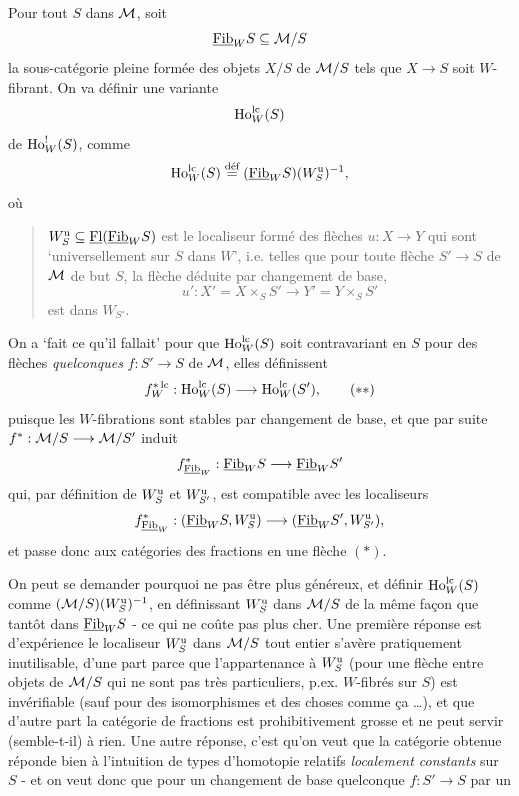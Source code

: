 Pour tout $S$ dans $\mathcal{M}$, soit
\[
\underline{\mathrm{Fib}}_W S \subseteq \mathcal{M}/S
\]
la sous-catégorie pleine formée des objets $X/S$ de $\mathcal{M}/S$ tels que $X \longrightarrow S$ soit $W$-fibrant. On va définir une variante
\[
\mathrm{Ho}^{\mathrm{lc}}_W(S)
\]
de $\mathrm{Ho}^!_W(S)$, comme
\[
\mathrm{Ho}^{\mathrm{lc}}_W(S) \overset{\text{déf}}{=} (\underline{\mathrm{Fib}}_W S)(W^{\mathrm{u}}_S)^{-1},
\]
où

\begin{quote}
$W^{\mathrm{u}}_S \subseteq \underline{\mathrm{Fl}}(\underline{\mathrm{Fib}}_W S)$ est le localiseur formé des flèches $u : X \longrightarrow Y$ qui sont ‘universellement sur $S$ dans $W$’, i.e. telles que pour toute flèche $S' \longrightarrow S$ de $\mathcal{M}$ de but $S$, la flèche déduite par changement de base,
\[
u' : X' = X \times_S S' \longrightarrow Y' = Y \times_S S'
\]
est dans $W_{S'}$.
\end{quote}

On a ‘fait ce qu'il fallait’ pour que $\mathrm{Ho}^{\mathrm{lc}}_W(S)$ soit contravariant en $S$ pour des flèches \textit{quelconques} $f : S' \longrightarrow S$ de $\mathcal{M}$, elles définissent
\[
f^{*\,\lc}_W : \Ho^{\lc}_W(S) \longrightarrow \Ho^{\lc}_W(S'), \tag*{$(**)$}
\]
puisque les $W$-fibrations sont stables par changement de base, et que par suite $f^* : \mathcal{M}/S \longrightarrow \mathcal{M}/S'$ induit
\[
f^*_{\underline{\mathrm{Fib}}_W} : \underline{\mathrm{Fib}}_W S \longrightarrow \underline{\mathrm{Fib}}_W S'
\]
qui, par définition de $W^{\mathrm{u}}_S$ et $W^{\mathrm{u}}_{S'}$, est compatible avec les localiseurs
\[
f^*_{\underline{\mathrm{Fib}}_W} : (\underline{\mathrm{Fib}}_W S, W^{\mathrm{u}}_S) \longrightarrow (\underline{\mathrm{Fib}}_W S', W^{\mathrm{u}}_{S'}),
\]
et passe donc aux catégories des fractions en une flèche $(*)$.

On peut se demander pourquoi ne pas être plus généreux, et définir $\mathrm{Ho}^{\mathrm{lc}}_W(S)$ comme $(\mathcal{M}/S)(W^{\mathrm{u}}_S)^{-1}$, en définissant $W^{\mathrm{u}}_S$ dans $\mathcal{M}/S$ de la même façon que tantôt dans $\underline{\mathrm{Fib}}_W S$ - ce qui ne coûte pas plus cher. Une première réponse est d'expérience le localiseur $W^{\mathrm{u}}_S$ dans $\mathcal{M}/S$ tout entier s'avère pratiquement inutilisable, d'une part parce que l'appartenance à $W^{\mathrm{u}}_S$ (pour une flèche entre objets de $\mathcal{M}/S$ qui ne sont pas très particuliers, p.ex. $W$-fibrés sur $S$) est invérifiable (sauf pour des isomorphismes et des choses comme ça \dots), et que d'autre part la catégorie de fractions est prohibitivement
grosse et ne peut servir (semble-t-il) à rien. Une autre réponse, c'est qu'on veut que la catégorie obtenue réponde bien à l'intuition de types d'homotopie relatifs \textit{localement constants} sur $S$ - et on veut donc que pour un changement de base quelconque $f : S' \longrightarrow S$ par un

